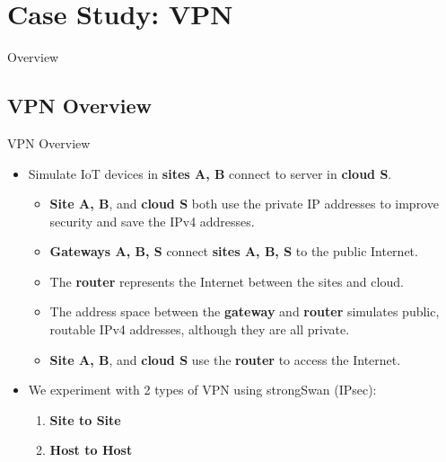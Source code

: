 \documentclass{beamer}
\begin{document}
\section{Case Study: VPN}
\begin{frame}{Overview}
    \tableofcontents[currentsection]
\end{frame}
\subsection{VPN Overview}
\begin{frame}{VPN Overview}
\begin{itemize}
\item Simulate IoT devices in \textbf{sites A, B} connect to server in \textbf{cloud S}.
\begin{itemize}
    \item \textbf{Site A, B}, and \textbf{cloud S} both use the private IP addresses to improve security and save the IPv4 addresses.
    \item \textbf{Gateways A, B, S} connect \textbf{sites A, B, S} to the public Internet.
    \item The \textbf{router} represents the Internet between the sites and cloud.
    \item The address space between the \textbf{gateway} and \textbf{router} simulates public, routable IPv4 addresses, although they are all private.
    \item \textbf{Site A, B}, and \textbf{cloud S} use the \textbf{router} to access the Internet.
\end{itemize}
\item We experiment with 2 types of VPN using strongSwan (IPsec):
\begin{enumerate}
    \item \textbf{Site to Site}
    \item \textbf{Host to Host}
\end{enumerate}
\end{itemize}
\end{frame}
\end{document}
